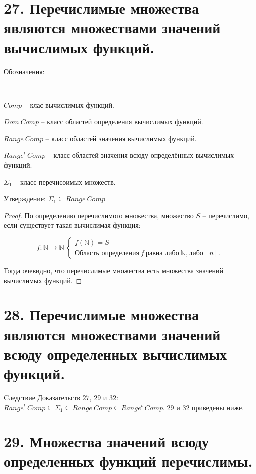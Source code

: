 \documentclass[a4paper, 12pt]{article}
\newcommand{\statement}{\underline{Утверждение:} }
\newcommand{\sign}{\underline{Обозначения:} }
\newcommand{\N}{\mathbb{N}}
\begin{document}
\section*{27. Перечислимые множества являются множествами значений вычислимых функций.}

\sign{
    \
    
    $Comp$ -- клас вычислимых функций.
    
    $Dom\ Comp$ -- класс областей определения вычислимых функций.
    
    $Range\ Comp$ -- класс областей значения вычислимых функций.
    
    $Range^t\ Comp$ -- класс областей значения всюду определённых вычислимых функций.
    
    $\Sigma_1$ -- класс перечисоимых множеств.
}

\statement{$\Sigma_1 \subseteq Range\ Comp$}
        
        \begin{proof}
            По определению перечислимого множества, множество $S$ -- перечислимо, если существует такая вычислимая функция:
            
            \[
                f: \N \to \N\ 
                \begin{cases}
                    f(\N) = S \\
                    \text{Область определения} \ f \ \text{равна либо} \ \N, \text{либо} \ [n].
                \end{cases}
            \]
            
            Тогда очевидно, что перечислимые множества есть множества значений вычислимых функций.
        \end{proof}

\section*{28. Перечислимые множества являются множествами значений всюду определенных вычислимых функций.}

Cледствие Доказательств $27$, $29$ и $32$: $Range^t\ Comp \subseteq \Sigma_1 \subseteq Range\ Comp \subseteq Range^t\ Comp$. $29$ и $32$ приведены ниже.


\section*{29. Множества значений всюду определенных функций перечислимы.}
\end{document}
